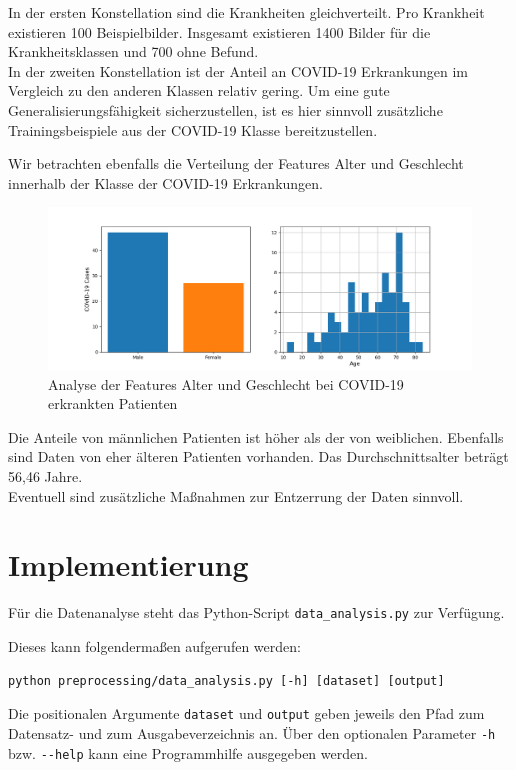 In der ersten Konstellation sind die Krankheiten gleichverteilt. Pro Krankheit existieren 100 Beispielbilder. Insgesamt existieren 1400 Bilder für die Krankheitsklassen und 700 ohne Befund.\\
In der zweiten Konstellation ist der Anteil an COVID-19 Erkrankungen im Vergleich zu den anderen Klassen relativ gering.
Um eine gute Generalisierungsfähigkeit sicherzustellen, ist es hier sinnvoll zusätzliche Trainingsbeispiele aus der COVID-19 Klasse bereitzustellen.

Wir betrachten ebenfalls die Verteilung der Features Alter und Geschlecht innerhalb der Klasse der COVID-19 Erkrankungen.

\begin{figure}[ht]
	\centering
	\includegraphics[width=\textwidth]{../results/features_analysis.png}
	\caption{Analyse der Features Alter und Geschlecht bei COVID-19 erkrankten Patienten}
\end{figure}

Die Anteile von männlichen Patienten ist höher als der von weiblichen. Ebenfalls sind Daten von eher älteren Patienten vorhanden. Das Durchschnittsalter beträgt 56,46 Jahre.\\
Eventuell sind zusätzliche Maßnahmen zur Entzerrung der Daten sinnvoll.

\section{Implementierung}

Für die Datenanalyse steht das Python-Script \verb|data_analysis.py| zur Verfügung.

Dieses kann folgendermaßen aufgerufen werden:

\begin{verbatim}
python preprocessing/data_analysis.py [-h] [dataset] [output]
\end{verbatim}

Die positionalen Argumente \verb|dataset| und \verb|output| geben jeweils den Pfad zum Datensatz- und zum Ausgabeverzeichnis an.
Über den optionalen Parameter \verb|-h| bzw. \verb|--help| kann eine Programmhilfe ausgegeben werden.